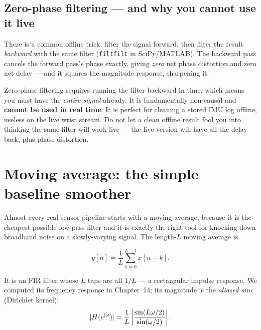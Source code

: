 \subsection{Zero-phase filtering --- and why you cannot use it live}

There is a common offline trick: filter the signal forward, then filter the
result \emph{backward} with the same filter (\texttt{filtfilt} in SciPy/MATLAB).
The backward pass cancels the forward pass's phase exactly, giving \emph{zero}
net phase distortion and zero net delay --- and it squares the magnitude
response, sharpening it.

\begin{trapbox}
Zero-phase filtering requires running the filter backward in time, which means
you must have the \emph{entire signal} already. It is fundamentally non-causal
and \textbf{cannot be used in real time}. It is perfect for cleaning a stored
IMU log offline, useless on the live wrist stream. Do not let a clean offline
result fool you into thinking the same filter will work live --- the live version
will have all the delay back, plus phase distortion.
\end{trapbox}

\section{Moving average: the simple baseline smoother}
\label{ch17:movingavg}

Almost every real sensor pipeline starts with a moving average, because it is the
cheapest possible low-pass filter and it is exactly the right tool for knocking
down broadband noise on a slowly-varying signal. The length-$L$ moving average is

\begin{equation}
  y[n] = \frac{1}{L}\sum_{k=0}^{L-1} x[n-k].
  \label{ch17:ma}
\end{equation}

It is an FIR filter whose $L$ taps are all $1/L$ --- a rectangular impulse
response. We computed its frequency response in Chapter~14; its magnitude is the
\emph{aliased sinc} (Dirichlet kernel):
\begin{equation}
  \lvert H(e^{\mathrm{j}\omega})\rvert
  = \frac{1}{L}\left|\frac{\sin(L\omega/2)}{\sin(\omega/2)}\right|.
  \label{ch17:ma-mag}
\end{equation}

